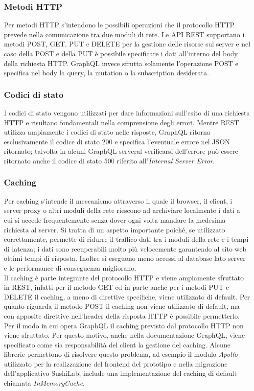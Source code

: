 \subsubsection*{Metodi HTTP}
Per metodi HTTP s'intendono le possibili operazioni che il protocollo HTTP prevede nella comunicazione tra due moduli di rete. Le API REST supportano i metodi POST, GET, PUT e DELETE per la gestione delle risorse sul server e nel caso della POST e della PUT è possibile specificare i dati all'interno del body della richiesta HTTP. GraphQL invece sfrutta solamente l'operazione POST e specifica nel body la query, la mutation o la subscription desiderata.
\subsubsection*{Codici di stato}
I codici di stato vengono utilizzati per dare informazioni sull'esito di una richiesta HTTP e risultano fondamentali nella comprensione degli errori. Mentre REST utilizza ampiamente i codici di stato nelle risposte, GraphQL ritorna esclusivamente il codice di stato 200 e specifica l'eventuale errore nel JSON ritornato; talvolta in alcuni GraphQL serveral verificarsi dell'errore può essere ritornato anche il codice di stato 500 riferito all'\textit{Internal Server Error}.
\subsubsection*{Caching}
Per caching s'intende il meccanismo attraverso il quale il browser, il client, i server proxy o altri moduli della rete riescono ad archiviare localmente i dati a cui si accede frequentemente senza dover ogni volta mandare la medesima richiesta al server. Si tratta di un aspetto importante poiché, se utilizzato correttamente, permette di ridurre il traffico dati tra i moduli della rete e i tempi di latenza; i dati sono recuperabili molto più velocemente garantendo al sito web ottimi tempi di risposta. Inoltre si eseguono meno accessi al database lato server e le performance di conseguenza migliorano.\\
Il caching è parte integrante del protocollo HTTP e viene ampiamente sfruttato in REST, infatti per il metodo GET ed in parte anche per i metodi PUT e DELETE il caching, a meno di direttive specifiche, viene utilizzato di default. Per quanto riguarda il metodo POST il caching non viene utilizzato di default, ma con apposite direttive nell'header della risposta HTTP è possibile permetterlo.\\
Per il modo in cui opera GraphQL il caching previsto dal protocollo HTTP non viene sfruttato. Per questo motivo, anche nella documentazione GraphQL, viene specificato come sia responsabilità del client la gestione del caching. Alcune librerie permettono di risolvere questo problema, ad esempio il modulo \textit{Apollo} utilizzato per la realizzazione del frontend del prototipo e nella migrazione dell'applicativo SushiLab, include una implementazione del caching di default chiamata \textit{InMemoryCache}.
